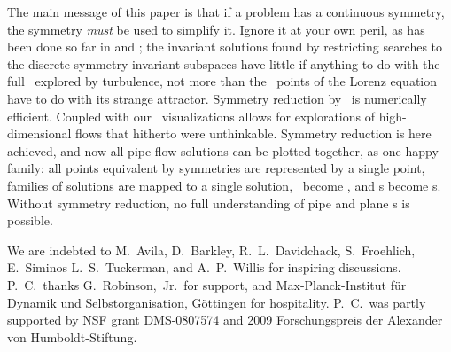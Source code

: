 The main message of this paper is that if a problem has a continuous
symmetry, the symmetry \emph{must} be used to simplify it. Ignore it at
your own peril, as has been done so far in \KS{}
and \pCf{}; the invariant solutions found by restricting
searches to the discrete-symmetry invariant subspaces have little if
anything to do with the full \statesp\ explored by turbulence, not more
than the \eqv\ points of the Lorenz equation have to do with its strange
attractor. Symmetry reduction by \mslices\ is numerically efficient.
Coupled with our \statesp\ visualizations allows for explorations of
high-dimensional flows that hitherto were unthinkable. Symmetry reduction
is here achieved, and now all pipe flow solutions can be plotted
together, as one happy family: all points equivalent by symmetries are
represented by a single point, families of solutions are mapped to a
single solution, \reqva\ become \eqva, and \rpo s become \po s. Without
symmetry reduction, no full understanding of pipe and plane \pCf s is
possible.

\begin{acknowledgments}
We are indebted to
M.~Avila,
D.~Barkley,
R.~L.~Davidchack,
S.~Froehlich,
E.~Siminos
L.~S.~Tuckerman,
and
A.~P.~Willis
for inspiring discussions.
P.~C.\ thanks G.~Robinson,~Jr.\ for support, and
Max-Planck-Institut f\"ur Dynamik und Selbstorganisation,
G\"ottingen for hospitality.
P.~C.\ was partly supported by NSF grant DMS-0807574
and
2009 Forschungspreis der Alexander von Humboldt-Stiftung.
\end{acknowledgments}
